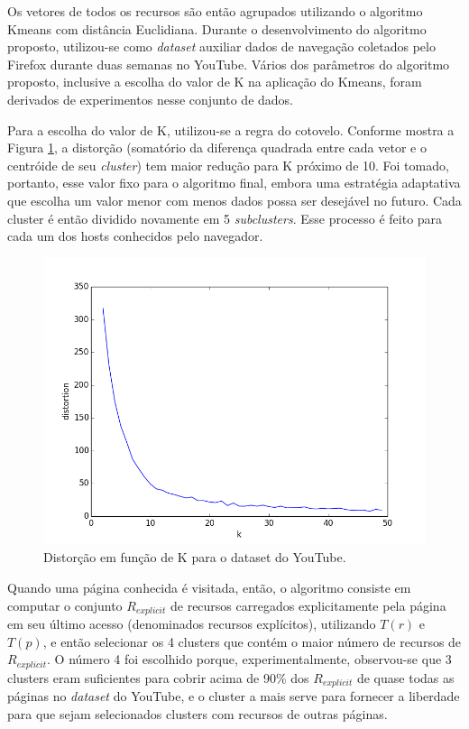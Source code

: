 \documentclass[10pt,twocolumn,letterpaper]{article}
\begin{document}
Os vetores de todos os recursos são então agrupados utilizando o algoritmo Kmeans com distância Euclidiana. Durante o desenvolvimento do algoritmo proposto, utilizou-se como \emph{dataset} auxiliar dados de navegação coletados pelo Firefox durante duas semanas no YouTube. Vários dos parâmetros do algoritmo proposto, inclusive a escolha do valor de K na aplicação do Kmeans, foram derivados de experimentos nesse conjunto de dados.

Para a escolha do valor de K, utilizou-se a regra do cotovelo. Conforme mostra a Figura \ref{fig-youtube-elbow}, a distorção (somatório da diferença quadrada entre cada vetor e o centróide de seu \emph{cluster}) tem maior redução para K próximo de 10. Foi tomado, portanto, esse valor fixo para o algoritmo final, embora uma estratégia adaptativa que escolha um valor menor com menos dados possa ser desejável no futuro. Cada cluster é então dividido novamente em 5 \emph{subclusters}. Esse processo é feito para cada um dos hosts conhecidos pelo navegador.

\begin{figure}
	\begin{center}
     \includegraphics[width=0.99\columnwidth]{pics/youtube_elbow.png}
    \caption{Distorção em função de K para o dataset do YouTube.}
    \label{fig-youtube-elbow}   
	\end{center} 
\end{figure}

Quando uma página conhecida é visitada, então, o algoritmo consiste em computar o conjunto $R_{explicit}$ de recursos carregados explicitamente pela página em seu último acesso (denominados recursos explícitos), utilizando $T(r)$ e $T(p)$, e então selecionar os 4 clusters que contém o maior número de recursos de $R_{explicit}$. O número 4 foi escolhido porque, experimentalmente, observou-se que 3 clusters eram suficientes para cobrir acima de 90\% dos $R_{explicit}$ de quase todas as páginas no \emph{dataset} do YouTube, e o cluster a mais serve para fornecer a liberdade para que sejam selecionados clusters com recursos de outras páginas.
\end{document}
